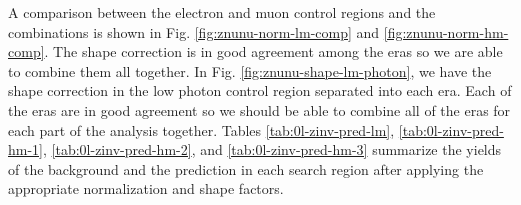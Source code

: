A comparison between the electron and muon control regions and the combinations is shown in Fig. \ref{fig:znunu-norm-lm-comp} and \ref{fig:znunu-norm-hm-comp}. The shape correction is in good agreement among the eras so we are able to combine them all together. In Fig. \ref{fig:znunu-shape-lm-photon}, we have the shape correction in the low \dm{} photon control region separated into each era. Each of the eras are in good agreement so we should be able to combine all of the eras for each part of the analysis together. Tables \ref{tab:0l-zinv-pred-lm}, \ref{tab:0l-zinv-pred-hm-1}, \ref{tab:0l-zinv-pred-hm-2}, and \ref{tab:0l-zinv-pred-hm-3} summarize the yields of the \Znunu{} background and the prediction in each search region after applying the appropriate normalization and shape factors.  






